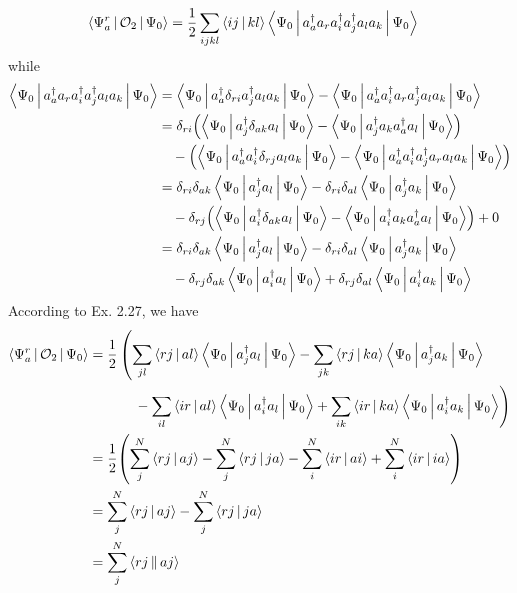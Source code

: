 \documentclass[a4paper]{article}
\begin{document}
\begin{align}
\Braket{\Psi_a^r | \mathcal{O}_2 | \Psi_0} &= \dfrac{1}{2} \sum_{ijkl} \Braket{ij|kl} \Braket{\Psi_0 | a_a^\dagger a_r a_i^\dagger a_j^\dagger a_l a_k | \Psi_0} 
\end{align}
while
\begin{align}
\Braket{\Psi_0 | a_a^\dagger a_r a_i^\dagger a_j^\dagger a_l a_k | \Psi_0} 
&= \Braket{\Psi_0 | a_a^\dagger \delta_{ri} a_j^\dagger a_l a_k | \Psi_0} - \Braket{\Psi_0 | a_a^\dagger a_i^\dagger a_r a_j^\dagger a_l a_k | \Psi_0} \notag\\
&= \delta_{ri} \qty(\Braket{\Psi_0 | a_j^\dagger \delta_{ak} a_l | \Psi_0}  - \Braket{\Psi_0 | a_j^\dagger a_k a_a^\dagger a_l | \Psi_0} ) \notag\\ 
  & \quad{} - \qty(\Braket{\Psi_0 | a_a^\dagger a_i^\dagger \delta_{rj} a_l a_k | \Psi_0} - \Braket{\Psi_0 | a_a^\dagger a_i^\dagger a_j^\dagger a_r a_l a_k | \Psi_0})\notag\\
&= \delta_{ri}\delta_{ak} \Braket{\Psi_0 | a_j^\dagger  a_l | \Psi_0}  - \delta_{ri}\delta_{al}\Braket{\Psi_0 | a_j^\dagger a_k | \Psi_0} \notag\\ 
  & \quad{} - \delta_{rj}\qty(\Braket{\Psi_0 | a_i^\dagger \delta_{ak} a_l| \Psi_0} - \Braket{\Psi_0 | a_i^\dagger a_k a_a^\dagger  a_l | \Psi_0} ) + 0 \notag\\
&= \delta_{ri}\delta_{ak} \Braket{\Psi_0 | a_j^\dagger  a_l | \Psi_0}  - \delta_{ri}\delta_{al}\Braket{\Psi_0 | a_j^\dagger a_k | \Psi_0} \notag\\ 
  & \quad{} - \delta_{rj}\delta_{ak} \Braket{\Psi_0 | a_i^\dagger a_l| \Psi_0} + \delta_{rj}\delta_{al} \Braket{\Psi_0 | a_i^\dagger a_k | \Psi_0}
\end{align}
According to Ex. 2.27, we have
\begin{align}
\Braket{\Psi_a^r | \mathcal{O}_2 | \Psi_0} &= \dfrac{1}{2} \left( \sum_{jl}\Braket{rj|al}\Braket{\Psi_0 | a_j^\dagger  a_l | \Psi_0} - \sum_{jk}\Braket{rj|ka}\Braket{\Psi_0 | a_j^\dagger  a_k | \Psi_0}\right. \notag\\
&  \left. \hspace{30pt} {} - \sum_{il}\Braket{ir|al}\Braket{\Psi_0 | a_i^\dagger  a_l | \Psi_0} + \sum_{ik}\Braket{ir|ka}\Braket{\Psi_0 | a_i^\dagger  a_k | \Psi_0}\right) \notag\\
&= \dfrac{1}{2}\qty(\sum_j^N\Braket{rj|aj} - \sum_j^N\Braket{rj|ja} - \sum_i^N\Braket{ir|ai} + \sum_i^N\Braket{ir|ia}) \notag\\
&= \sum_j^N\Braket{rj|aj} - \sum_j^N\Braket{rj|ja} \notag\\
&= \sum_j^N\Braket{rj||aj}
\end{align}
\end{document}

